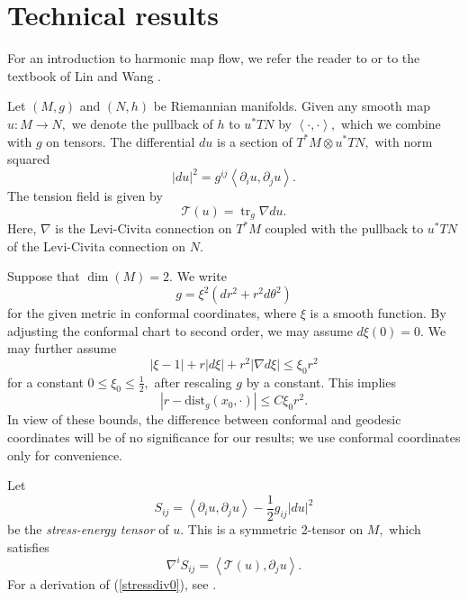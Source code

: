 \documentclass[12pt]{amsart}
\newcommand{\LA}{\left\langle}
\newcommand{\RA}{\right\rangle}
\newcommand{\T}{{\mathcal T}}
\newcommand{\dist}{{\mbox{dist}}}
\theoremstyle{others}
\numberwithin{equation}{section}
\DeclareMathOperator{\tr}{tr}
\renewcommand{\th}{\theta}
\newcommand{\p}{\partial}
\newcommand{\n}{\nabla}
\begin{document}
\section{Technical results}

For an introduction to harmonic map flow, we refer the reader to \cite[\S 2]{songwaldron} or to the textbook of Lin and Wang \cite{linwangbook}.

Let $(M,g)$ and $(N,h)$ be Riemannian manifolds.
Given any smooth map $u : M \to N,$ we denote the pullback of $h$ to $u^*TN$ by $\LA \cdot, \cdot \RA,$ which we combine with $g$ on tensors.
The differential $du$ is a section of $T^*M \otimes u^*TN,$ with norm squared
$$|du|^2 = g^{ij} \LA \p_i u, \p_j u \RA.$$
The tension field is given by
$$\T(u) = \tr_g \n du.$$
Here, $\nabla$ is the Levi-Civita connection on $T^*M$ coupled with the pullback to $u^*TN$ of the Levi-Civita connection on $N.$

Suppose that $\dim(M) = 2.$ %
We write
\begin{equation}\label{conformalmetric}
g=\xi^2(dr^2+r^2d\th^2)
\end{equation}
for the given metric in conformal coordinates, where $\xi$ is a smooth function. By adjusting the conformal chart to second order, we may assume $d \xi (0) = 0.$ We may further assume
\begin{equation}\label{smallness1}
\left| \xi - 1\right| + r|d \xi| + r^2 |\nabla d \xi| \leq \xi_0 r^2
\end{equation}
for a constant $0 \leq \xi_0 \leq \frac12,$ after rescaling $g$ by a constant. This implies
\begin{equation}\label{rversusdist}
|r- \dist_g(x_0, \cdot)| \leq C \xi_0 r^2.
\end{equation}
In view of these bounds, the difference between conformal and geodesic coordinates will be of no significance for our results; we use conformal coordinates only for convenience.

Let
$$S_{ij} = \LA \p_i u , \p_j u \RA - \frac12 g_{ij} |du|^2$$
be the \emph{stress-energy tensor} of $u.$ This is a symmetric 2-tensor on $M,$ which satisfies
\begin{equation}\label{stressdiv0}
\nabla^i S_{ij} = \LA \T(u), \p_j u \RA.
\end{equation}
For a derivation of (\ref{stressdiv0}), see \cite[\S 2.2]{songwaldron}.
\end{document}
